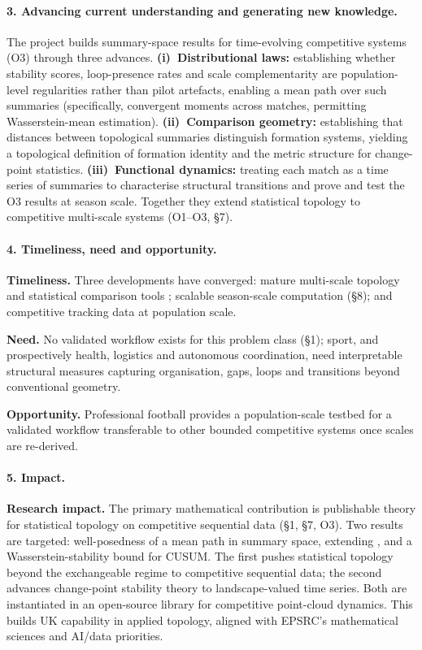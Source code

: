 \paragraph{3. Advancing current understanding and generating new knowledge.}
The project builds summary-space results for time-evolving competitive systems (O3) through three advances. \textbf{(i)~Distributional laws:} establishing whether stability scores, loop-presence rates and scale complementarity are population-level regularities rather than pilot artefacts, enabling a mean path over such summaries (specifically, convergent moments across matches, permitting Wasserstein-mean estimation). \textbf{(ii)~Comparison geometry:} establishing that distances between topological summaries \citep{Bubenik2015,Adams2017} distinguish formation systems, yielding a topological definition of formation identity and the metric structure for change-point statistics. \textbf{(iii)~Functional dynamics:} treating each match as a time series of summaries to characterise structural transitions and prove and test the O3 results at season scale. Together they extend statistical topology \citep{Chazal2014,Bubenik2015,Adams2017} to competitive multi-scale systems (O1--O3, \S7).

\paragraph{4. Timeliness, need and opportunity.}
\textbf{Timeliness.} Three developments have converged: mature multi-scale topology and statistical comparison tools \citep{BotnanLesnick2022,Chazal2014,Bubenik2015,Adams2017}; scalable season-scale computation (\S8); and competitive tracking data at population scale.

\textbf{Need.} No validated workflow exists for this problem class (\S1); sport, and prospectively health, logistics and autonomous coordination, need interpretable structural measures capturing organisation, gaps, loops and transitions beyond conventional geometry.

\textbf{Opportunity.} Professional football provides a population-scale testbed for a validated workflow transferable to other bounded competitive systems once scales are re-derived.

\paragraph{5. Impact.}
\textbf{Research impact.} The primary mathematical contribution is publishable theory for statistical topology on competitive sequential data (\S1, \S7, O3). Two results are targeted: well-posedness of a mean path in summary space, extending \citep{Chazal2014}, and a Wasserstein-stability bound for CUSUM. The first pushes statistical topology beyond the exchangeable regime to competitive sequential data; the second advances change-point stability theory to landscape-valued time series. Both are instantiated in an open-source library for competitive point-cloud dynamics. This builds UK capability in applied topology, aligned with EPSRC's mathematical sciences and AI/data priorities.

